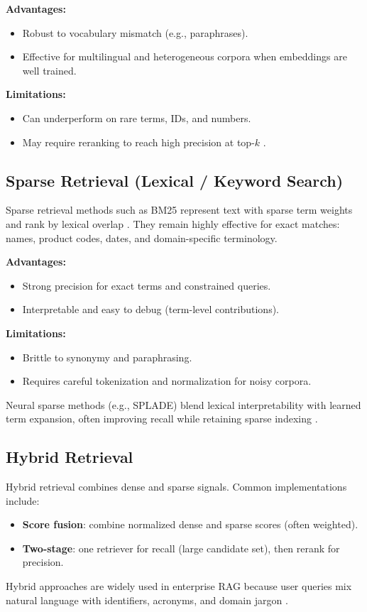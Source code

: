 \textbf{Advantages:}  
\begin{itemize}
    \item Robust to vocabulary mismatch (e.g., paraphrases).
    \item Effective for multilingual and heterogeneous corpora when embeddings are well trained.
\end{itemize}

\textbf{Limitations:}  
\begin{itemize}
    \item Can underperform on rare terms, IDs, and numbers.
    \item May require reranking to reach high precision at top-$k$ \cite{Thakur2021BEIR}.
\end{itemize}

\subsection{Sparse Retrieval (Lexical / Keyword Search)}
Sparse retrieval methods such as BM25 represent text with sparse term weights and rank by lexical overlap \cite{robertson2009bm25}. They remain highly effective for exact matches: names, product codes, dates, and domain-specific terminology.

\textbf{Advantages:}  
\begin{itemize}
    \item Strong precision for exact terms and constrained queries.
    \item Interpretable and easy to debug (term-level contributions).
\end{itemize}

\textbf{Limitations:}  
\begin{itemize}
    \item Brittle to synonymy and paraphrasing.
    \item Requires careful tokenization and normalization for noisy corpora.
\end{itemize}

Neural sparse methods (e.g., SPLADE) blend lexical interpretability with learned term expansion, often improving recall while retaining sparse indexing \cite{Lin2021SPLADE,AWS2023NeuralSparse}.

\subsection{Hybrid Retrieval}
Hybrid retrieval combines dense and sparse signals. Common implementations include:
\begin{itemize}
    \item \textbf{Score fusion}: combine normalized dense and sparse scores (often weighted).
    \item \textbf{Two-stage}: one retriever for recall (large candidate set), then rerank for precision.
\end{itemize}
Hybrid approaches are widely used in enterprise RAG because user queries mix natural language with identifiers, acronyms, and domain jargon \cite{Thakur2021BEIR,Lin2021SPLADE}.

